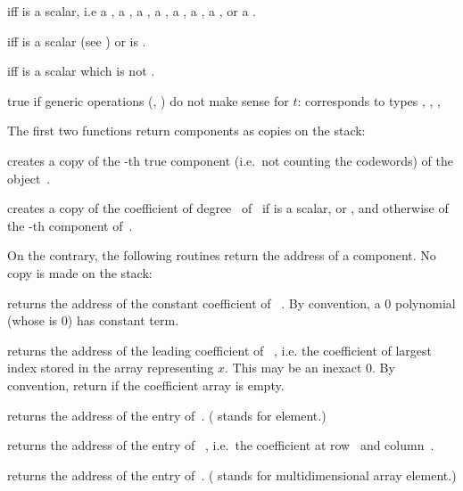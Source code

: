   iff  is a scalar, i.e
a ,
a ,
a ,
a ,
a ,
a ,
a ,
or
a .

  iff  is a scalar (see
) or  is .

  iff  is a scalar which is not
.

 true if generic operations (,
) do not make sense for $t$: corresponds to types
, , , 

\label{se:accessors}
The first two functions return  components as copies on the stack:

 creates a copy of the -th true
component (i.e.\ not counting the codewords) of the object~.

 creates a copy of the coefficient of
degree~ of~ if  is a scalar,  or ,
and otherwise of the -th component of~.
\smallskip

\noindent On the contrary, the following routines return the address of a
 component. No copy is made on the stack:

 returns the address of the constant
coefficient of ~. By convention, a $0$ polynomial (whose
 is $0$) has  constant term.

 returns the address of the leading coefficient
of ~, i.e. the coefficient of largest index stored in the
array representing $x$. This may be an inexact $0$. By convention, return
 if the coefficient array is empty.

 returns the address of the
 entry of~. ( stands for element.)

 returns the address of the
 entry of ~, i.e.~the coefficient at row~
and column~.

 returns the address of the
 entry of~. ( stands for multidimensional array
element.)

